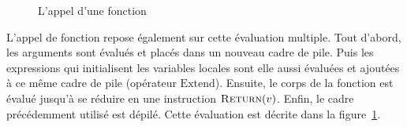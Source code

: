 \shorthandoff{!}
\begin{figure}

  \centering


  \caption{L'appel d'une fonction}
  \label{fig:fcall-details}

\end{figure}
\shorthandon{!}

L'appel de fonction repose également sur cette évaluation multiple. Tout
d'abord, les arguments sont évalués et placés dans un nouveau cadre de pile.
Puis les expressions qui initialisent les variables locales sont elle aussi
évaluées et ajoutées à ce même cadre de pile (opérateur $\mathrm{Extend}$).
Ensuite, le corps de la fonction est évalué jusqu'à se réduire en une
instruction $\textsc{Return}(v)$. Enfin, le cadre précédemment utilisé est dépilé.
Cette évaluation est décrite dans la figure~\ref{fig:fcall-details}.

